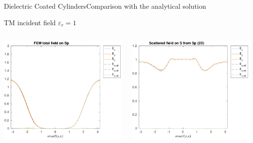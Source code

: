 \begin{frame}[allowframebreaks]{Dielectric Coated Cylinders}{Comparison with the analytical solution }
    \framebreak
        
    \hfill TM incident field $\varepsilon_r=1$ \hfill\mbox{}

    \begin{columns}
      \includegraphics[width=\linewidth]{results/TM/E_Sp.pdf}

      \includegraphics[width=\linewidth]{results/TM/E_S.pdf}
      

\end{columns}
\end{frame}
